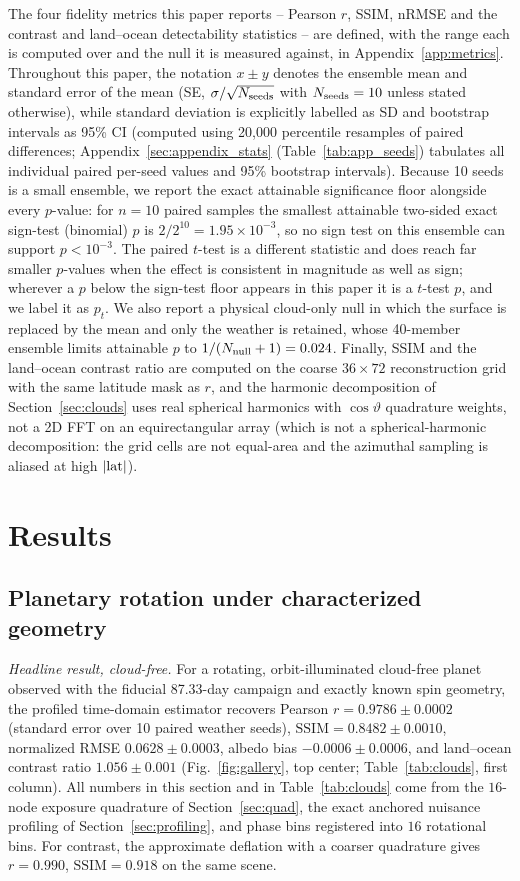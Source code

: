 \documentclass[twocolumn,10pt]{article}
\begin{document}
The four fidelity metrics this paper reports -- Pearson $r$, SSIM, nRMSE and the contrast and land--ocean detectability statistics -- are defined, with the range each is computed over and the null it is measured against, in Appendix~\ref{app:metrics}.
Throughout this paper, the notation $x \pm y$ denotes the ensemble mean and standard error of the mean (SE, $\sigma/\sqrt{N_{\rm seeds}}$ with $N_{\rm seeds}=10$ unless stated otherwise), while standard deviation is explicitly labelled as SD and bootstrap intervals as 95\% CI (computed using 20{,}000 percentile resamples of paired differences; Appendix~\ref{sec:appendix_stats} (Table~\ref{tab:app_seeds}) tabulates all individual paired per-seed values and 95\% bootstrap intervals).
Because 10 seeds is a small ensemble, we report the exact attainable
significance floor alongside every $p$-value: for $n=10$ paired samples the
smallest attainable two-sided exact sign-test (binomial) $p$ is $2/2^{10}=1.95\times10^{-3}$, so no sign test on this ensemble can support $p<10^{-3}$. The paired $t$-test is a different
statistic and does reach far smaller $p$-values when the effect is consistent
in magnitude as well as sign; wherever a $p$ below the sign-test floor appears
in this paper it is a $t$-test $p$, and we label it as $p_t$. We also report a physical cloud-only null in which the surface is replaced by the mean and only
the weather is retained, whose 40-member ensemble limits attainable $p$ to
$1/(N_{\rm null}+1)=0.024$.
Finally, SSIM and the land--ocean contrast ratio are computed on the
coarse $36\times72$ reconstruction grid with the same latitude mask as $r$, and
the harmonic decomposition of Section~\ref{sec:clouds} uses real spherical
harmonics with $\cos\vartheta$ quadrature weights, not a 2D FFT on an
equirectangular array (which is not a spherical-harmonic decomposition: the
grid cells are not equal-area and the azimuthal sampling is aliased at high
$|{\rm lat}|$).

\section{Results}
\label{sec:results}

\subsection{Planetary rotation under characterized geometry}
\label{sec:rotation}
\emph{Headline result, cloud-free.} For a rotating, orbit-illuminated
cloud-free planet observed with the fiducial 87.33-day campaign and exactly known
spin geometry, the profiled time-domain estimator recovers Pearson
$r=0.9786\pm0.0002$ (standard error over 10 paired weather seeds),
$\mathrm{SSIM}=0.8482\pm0.0010$, normalized RMSE $0.0628\pm0.0003$, albedo bias
$-0.0006\pm0.0006$, and land--ocean contrast ratio $1.056\pm0.001$
(Fig.~\ref{fig:gallery}, top center; Table~\ref{tab:clouds}, first column). All
numbers in this section and in Table~\ref{tab:clouds} come from the $16$-node
exposure quadrature of Section~\ref{sec:quad}, the exact anchored nuisance
profiling of Section~\ref{sec:profiling}, and phase bins registered into
$16$ rotational bins. For contrast, the approximate deflation with a coarser
quadrature gives $r=0.990$, $\mathrm{SSIM}=0.918$ on the same scene.
\end{document}
